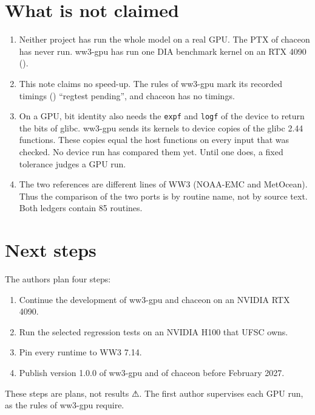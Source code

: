 \documentclass[10pt,a4paper,]{article}
\providecommand{\tightlist}{\setlength{\itemsep}{0pt}\setlength{\parskip}{0pt}}
\begin{document}
\section{What is not claimed}\label{sec:limits}

\begin{enumerate}
\def\labelenumi{\arabic{enumi}.}
\tightlist
\item
  Neither project has run the whole model on a real GPU. The PTX of
  chaceon has never run. ww3-gpu has run one DIA benchmark kernel on an
  RTX 4090 ().
\item
  This note claims no speed-up. The rules of ww3-gpu mark its recorded
  timings () ``regtest
  pending'', and chaceon has no timings.
\item
  On a GPU, bit identity also needs the \texttt{expf} and \texttt{logf}
  of the device to return the bits of glibc. ww3-gpu sends its kernels
  to device copies of the glibc 2.44 functions. These copies equal the
  host functions on every input that was checked. No device run has
  compared them yet. Until one does, a fixed tolerance judges a GPU run.
\item
  The two references are different lines of WW3 (NOAA-EMC and MetOcean).
  Thus the comparison of the two ports is by routine name, not by source
  text. Both ledgers contain 85 routines.
\end{enumerate}

\section{Next steps}\label{sec:next}

The authors plan four steps:

\begin{enumerate}
\def\labelenumi{\arabic{enumi}.}
\tightlist
\item
  Continue the development of ww3-gpu and chaceon on an NVIDIA RTX 4090.
\item
  Run the selected regression tests on an NVIDIA H100 that UFSC owns.
\item
  Pin every runtime to WW3 7.14.
\item
  Publish version 1.0.0 of ww3-gpu and of chaceon before February 2027.
\end{enumerate}

These steps are plans, not results ⚠. The first author supervises each
GPU run, as the rules of ww3-gpu require.
\end{document}
